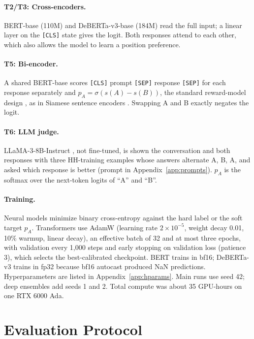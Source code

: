 \documentclass[11pt]{article}
\newcommand{\pa}{p_{A}}
\begin{document}
\paragraph{T2/T3: Cross-encoders.} BERT-base \citep{devlin2019bert} (110M) and DeBERTa-v3-base \citep{he2023debertav3} (184M) read the full input; a linear layer on the \texttt{[CLS]} state gives the logit. Both responses attend to each other, which also allows the model to learn a position preference.

\paragraph{T5: Bi-encoder.} A shared BERT-base scores \texttt{[CLS]} prompt \texttt{[SEP]} response \texttt{[SEP]} for each response separately and $\pa=\sigma(s(A)-s(B))$, the standard reward-model design \citep{ouyang2022training}, as in Siamese sentence encoders \citep{reimers2019sentence}. Swapping A and B exactly negates the logit.

\paragraph{T6: LLM judge.} LLaMA-3-8B-Instruct \citep{dubey2024llama}, not fine-tuned, is shown the conversation and both responses with three HH-training examples whose answers alternate A, B, A, and asked which response is better (prompt in Appendix~\ref{app:prompts}). $\pa$ is the softmax over the next-token logits of ``A'' and ``B''.

\paragraph{Training.} Neural models minimize binary cross-entropy against the hard label or the soft target $\pa$. Transformers use AdamW (learning rate $2\times10^{-5}$, weight decay 0.01, 10\% warmup, linear decay), an effective batch of 32 and at most three epochs, with validation every 1,000 steps and early stopping on validation loss (patience 3), which selects the best-calibrated checkpoint. BERT trains in bf16; DeBERTa-v3 trains in fp32 because bf16 autocast produced NaN predictions. Hyperparameters are listed in Appendix~\ref{app:hparams}. Main runs use seed 42; deep ensembles add seeds 1 and 2. Total compute was about 35 GPU-hours on one RTX 6000 Ada.

\section{Evaluation Protocol}
\label{sec:eval}
\end{document}
